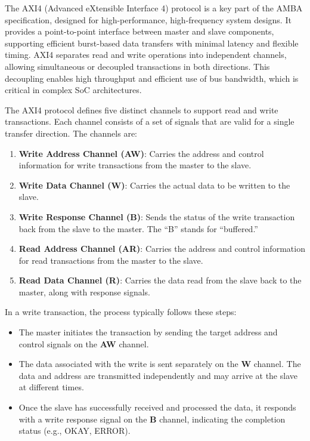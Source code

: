 The AXI4 (Advanced eXtensible Interface 4) protocol is a key part of the AMBA specification, designed for high-performance, high-frequency system designs. It provides a point-to-point interface between master and slave components, supporting efficient burst-based data transfers with minimal latency and flexible timing. AXI4 separates read and write operations into independent channels, allowing simultaneous or decoupled transactions in both directions. This decoupling enables high throughput and efficient use of bus bandwidth, which is critical in complex SoC architectures.

The AXI4 protocol defines five distinct channels to support read and write transactions. Each channel consists of a set of signals that are valid for a single transfer direction. The channels are:

\begin{enumerate}
    \item \textbf{Write Address Channel (AW)}: Carries the address and control information for write transactions from the master to the slave.
    \item \textbf{Write Data Channel (W)}: Carries the actual data to be written to the slave.
    \item \textbf{Write Response Channel (B)}: Sends the status of the write transaction back from the slave to the master. The “B” stands for “buffered.”
    \item \textbf{Read Address Channel (AR)}: Carries the address and control information for read transactions from the master to the slave.
    \item \textbf{Read Data Channel (R)}: Carries the data read from the slave back to the master, along with response signals.
\end{enumerate}

In a write transaction, the process typically follows these steps:

\begin{itemize}
    \item The master initiates the transaction by sending the target address and control signals on the \textbf{AW} channel.
    \item The data associated with the write is sent separately on the \textbf{W} channel. The data and address are transmitted independently and may arrive at the slave at different times.
    \item Once the slave has successfully received and processed the data, it responds with a write response signal on the \textbf{B} channel, indicating the completion status (e.g., OKAY, ERROR).
\end{itemize}


